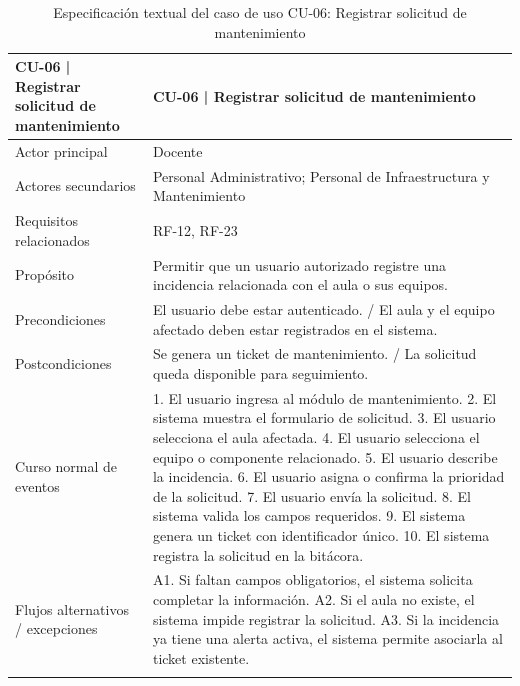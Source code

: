 \begingroup
\small
\begin{longtable}{|P{0.5000}|P{0.5000}|}
\hline
CU-06 | Registrar solicitud de mantenimiento & CU-06 | Registrar solicitud de mantenimiento \\ \hline
Actor principal & Docente \\ \hline
Actores secundarios & Personal Administrativo; Personal de Infraestructura y Mantenimiento \\ \hline
Requisitos relacionados & RF-12, RF-23 \\ \hline
Propósito & Permitir que un usuario autorizado registre una incidencia relacionada con el aula o sus equipos. \\ \hline
Precondiciones & El usuario debe estar autenticado. / El aula y el equipo afectado deben estar registrados en el sistema. \\ \hline
Postcondiciones & Se genera un ticket de mantenimiento. / La solicitud queda disponible para seguimiento. \\ \hline
Curso normal de eventos & 1. El usuario ingresa al módulo de mantenimiento. 2. El sistema muestra el formulario de solicitud. 3. El usuario selecciona el aula afectada. 4. El usuario selecciona el equipo o componente relacionado. 5. El usuario describe la incidencia. 6. El usuario asigna o confirma la prioridad de la solicitud. 7. El usuario envía la solicitud. 8. El sistema valida los campos requeridos. 9. El sistema genera un ticket con identificador único. 10. El sistema registra la solicitud en la bitácora. \\ \hline
Flujos alternativos / excepciones & A1. Si faltan campos obligatorios, el sistema solicita completar la información. A2. Si el aula no existe, el sistema impide registrar la solicitud. A3. Si la incidencia ya tiene una alerta activa, el sistema permite asociarla al ticket existente. \\ \hline
\caption{Especificación textual del caso de uso CU-06: Registrar solicitud de mantenimiento}
\end{longtable}
\endgroup

